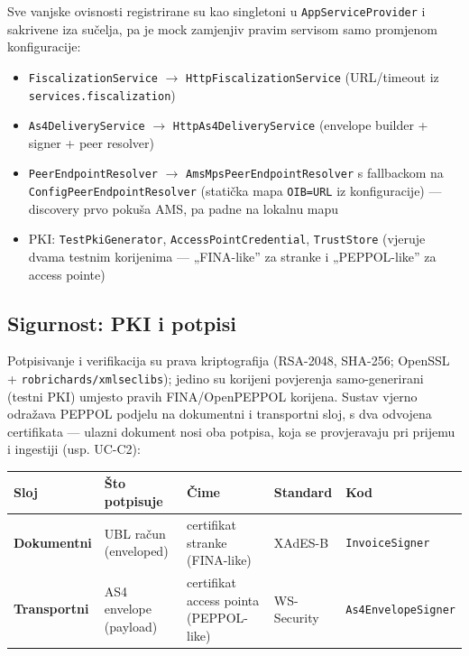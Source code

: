 \documentclass[11pt,a4paper]{article}
\begin{document}
Sve vanjske ovisnosti registrirane su kao singletoni u \texttt{AppServiceProvider} i sakrivene
iza sučelja, pa je mock zamjenjiv pravim servisom samo promjenom konfiguracije:

\begin{itemize}[nosep]
  \item \texttt{FiscalizationService} $\rightarrow$ \texttt{HttpFiscalizationService} (URL/timeout iz \texttt{services.fiscalization})
  \item \texttt{As4DeliveryService} $\rightarrow$ \texttt{HttpAs4DeliveryService} (envelope builder + signer + peer resolver)
  \item \texttt{PeerEndpointResolver} $\rightarrow$ \texttt{AmsMpsPeerEndpointResolver} s fallbackom na
        \texttt{ConfigPeerEndpointResolver} (statička mapa \texttt{OIB=URL} iz konfiguracije) — discovery prvo
        pokuša AMS, pa padne na lokalnu mapu
  \item PKI: \texttt{TestPkiGenerator}, \texttt{AccessPointCredential}, \texttt{TrustStore} (vjeruje dvama testnim
        korijenima — „FINA-like” za stranke i „PEPPOL-like” za access pointe)
\end{itemize}

\subsection{Sigurnost: PKI i potpisi}\label{sec:pki}

Potpisivanje i verifikacija su prava kriptografija (RSA-2048, SHA-256; OpenSSL +
\texttt{robrichards/xmlseclibs}); jedino su korijeni povjerenja samo-generirani
(testni PKI) umjesto pravih FINA/OpenPEPPOL korijena. Sustav vjerno odražava PEPPOL podjelu na
dokumentni i transportni sloj, s dva odvojena certifikata — ulazni dokument
nosi oba potpisa, koja se provjeravaju pri prijemu i ingestiji (usp. UC-C2):

\begin{tabularx}{\textwidth}{@{}lYYll@{}}
\toprule
\textbf{Sloj} & \textbf{Što potpisuje} & \textbf{Čime} & \textbf{Standard} & \textbf{Kod} \\
\midrule
\textbf{Dokumentni} & UBL račun (enveloped) & certifikat stranke (FINA-like) & XAdES-B & \texttt{InvoiceSigner} \\
\textbf{Transportni} & AS4 envelope (payload) & certifikat access pointa (PEPPOL-like) & WS-Security & \texttt{As4EnvelopeSigner} \\
\bottomrule
\end{tabularx}
\end{document}
